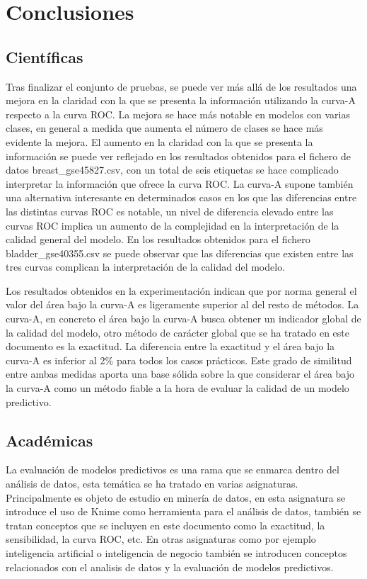 \section{Conclusiones}

\subsection{Científicas}

Tras finalizar el conjunto de pruebas, se puede ver más allá de los resultados una mejora en la claridad con la que se presenta la información utilizando la curva-A respecto a la curva ROC. La mejora se hace más notable en modelos con varias clases, en general a medida que aumenta el número de clases se hace más evidente la mejora. El aumento en la claridad con la que se presenta la información se puede ver reflejado en los resultados obtenidos para el fichero de datos breast\_gse45827.csv, con un total de seis etiquetas se hace complicado interpretar la información que ofrece la curva ROC. La curva-A supone también una alternativa interesante en determinados casos en los que las diferencias entre las distintas curvas ROC es notable, un nivel de diferencia elevado entre las curvas ROC implica un aumento de la complejidad en la interpretación de la calidad general del modelo. En los resultados obtenidos para el fichero bladder\_gse40355.csv se puede observar que las diferencias que existen entre las tres curvas complican la interpretación de la calidad del modelo.

\bigbreak

Los resultados obtenidos en la experimentación indican que por norma general el valor del área bajo la curva-A es ligeramente superior al del resto de métodos. La curva-A, en concreto el área bajo la curva-A busca obtener un indicador global de la calidad del modelo, otro método de carácter global que se ha tratado en este documento es la exactitud. La diferencia entre la exactitud y el área bajo la curva-A es inferior al 2\% para todos los casos prácticos. Este grado de similitud entre ambas medidas aporta una base sólida sobre la que considerar el área bajo la curva-A como un método fiable a la hora de evaluar la calidad de un modelo predictivo.

\subsection{Académicas}

La evaluación de modelos predictivos es una rama que se enmarca dentro del análisis de datos, esta temática se ha tratado en varias asignaturas. Principalmente es objeto de estudio en minería de datos, en esta asignatura se introduce el uso de Knime como herramienta para el análisis de datos, también se tratan conceptos que se incluyen en este documento como la exactitud, la sensibilidad, la curva ROC, etc. En otras asignaturas como por ejemplo inteligencia artificial o inteligencia de negocio también se introducen conceptos relacionados con el analisis de datos y la evaluación de modelos predictivos.

